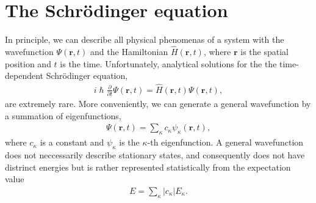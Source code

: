 \begin{comment}
A general wavefunction can be generated by a summation of eigenfunctions (such as the eigenfunction in the latter case)
\begin{align}
\Psi(r,t) = \sum_\kappa c_\kappa \psi_{\kappa}(r,t),
\end{align}
where $c_\kappa$ is a constant. A general wavefunction does not neccessarily describe stationary states, and consequently does not have distinct energies but is rather represented statistically from the expectation value
\begin{align*}
  E = \sum_{\kappa} \lvert c_\kappa \rvert \varepsilon_\kappa.
\end{align*}
Solving Schrödinger equation for a general wavefunction is rather troublesome. Fortunately, we can use the eigenfunctions instead, transforming equation \ref{eq:tise_nesten} into time-independent Schrödinger equation for eigenfunctions
\begin{align}
  \hat{H} \psi_{\kappa}(r) = \varepsilon_\kappa \psi_\kappa(r).
\end{align}

The shape of en eigenfunction has normally high spatial symmetri that depends on the symmetri of the potential $V_{ext}(r)$ and the boundary conditions \cite{Persson2020}. The study of how atoms in a crystalline interact with each other is of upmost importance when trying to explain macroscopic consequences.

\end{comment}

\section{The Schrödinger equation}

In principle, we can describe all physical phenomenas of a system with the wavefunction $\Psi(\textbf{r},t)$ and the Hamiltonian $\hat{H}(\textbf{r},t)$, where $\textbf{r}$ is the spatial position and $t$ is the time. Unfortunately, analytical solutions for the the time-dependent Schrödinger equation,
\begin{align}
    i\hslash \frac{\partial}{\partial t} \Psi(\textbf{r},t) = \hat{H}(\textbf{r},t) \Psi(\textbf{r},t),
    \label{eq:tdse}
\end{align}
are extremely rare. More conveniently, we can generate a general wavefunction by a summation of eigenfunctions,
\begin{align}
  \Psi(\textbf{r},t) = \sum_\kappa c_\kappa \psi_\kappa(\textbf{r},t),
\end{align}
where $c_\kappa$ is a constant and $\psi_\kappa$ is the $\kappa$-th eigenfunction. A general wavefunction does not neccessarily describe stationary states, and consequently does not have distrinct energies but is rather represented statistically from the expectation value
\begin{align}
  E = \sum_\kappa \lvert c_\kappa \rvert E_\kappa.
\end{align}

